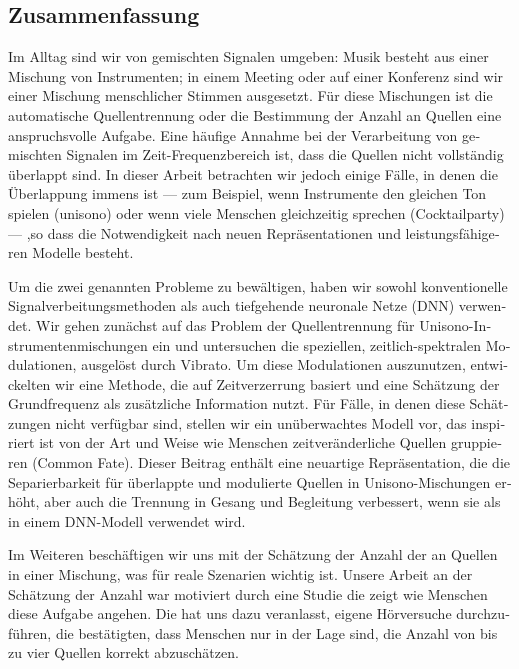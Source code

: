 \begin{otherlanguage}{ngerman}
\chapter*{Zusammenfassung}

Im Alltag sind wir von gemischten Signalen umgeben: Musik besteht aus einer Mischung von Instrumenten; in einem Meeting oder auf einer Konferenz sind wir einer Mischung menschlicher Stimmen ausgesetzt.
Für diese Mischungen ist die automatische Quellentrennung oder die Bestimmung der Anzahl an Quellen eine anspruchsvolle Aufgabe.
Eine häufige Annahme bei der Verarbeitung von gemischten Signalen im Zeit-Frequenzbereich ist, dass die Quellen nicht vollständig überlappt sind.
In dieser Arbeit betrachten wir jedoch einige Fälle, in denen die Überlappung immens ist --- zum Beispiel, wenn Instrumente den gleichen Ton spielen (unisono) oder wenn viele Menschen gleichzeitig sprechen (Cocktailparty) --- ,so dass die Notwendigkeit nach neuen Repräsentationen und leistungsfähigeren Modelle besteht.
\par
Um die zwei genannten Probleme zu bewältigen, haben wir sowohl konventionelle Signalverbeitungsmethoden als  auch tiefgehende neuronale Netze (DNN) verwendet.
Wir gehen zunächst auf das Problem der Quellentrennung für Unisono-Instrumentenmischungen ein und untersuchen die speziellen, zeitlich-spektralen Modulationen, ausgelöst durch Vibrato.
Um diese Modulationen auszunutzen, entwickelten wir eine Methode, die auf Zeitverzerrung basiert und eine Schätzung der Grundfrequenz als zusätzliche Information nutzt.
Für Fälle, in denen diese Schätzungen nicht verfügbar sind, stellen wir ein unüberwachtes Modell vor, das inspiriert ist von der Art und Weise wie Menschen zeitveränderliche Quellen gruppieren (Common Fate).
Dieser Beitrag enthält eine neuartige Repräsentation, die die Separierbarkeit für überlappte und modulierte Quellen in Unisono-Mischungen erhöht, aber auch die Trennung in Gesang und Begleitung verbessert, wenn sie als in einem DNN-Modell verwendet wird.
\par
Im Weiteren beschäftigen wir uns mit der Schätzung der Anzahl der an Quellen in einer Mischung, was für reale Szenarien wichtig ist.
Unsere Arbeit an der Schätzung der Anzahl war motiviert durch eine Studie die zeigt wie Menschen diese Aufgabe angehen.
Die hat uns dazu veranlasst, eigene Hörversuche durchzuführen, die bestätigten, dass Menschen nur in der Lage sind, die Anzahl von bis zu vier Quellen korrekt abzuschätzen.

\end{otherlanguage}
